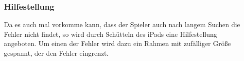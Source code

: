 \subsubsection{Hilfestellung}
Da es auch mal vorkomme kann, dass der Spieler auch nach langem Suchen die Fehler nicht findet,
so wird durch Schütteln des iPads eine Hilfestellung angeboten. Um einen der Fehler wird dazu ein Rahmen mit zufälliger Größe gespannt, der den Fehler eingrenzt.

